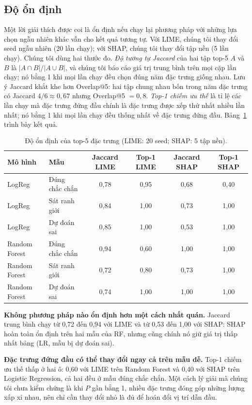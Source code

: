 \documentclass[11pt,a4paper]{article}
\begin{document}
\subsection{Độ ổn định}
\label{sec:stability}
Một lời giải thích được coi là ổn định nếu chạy lại phương pháp với những lựa
chọn ngẫu nhiên khác vẫn cho kết quả tương tự. Với LIME, chúng tôi thay đổi
seed ngẫu nhiên (20 lần chạy); với SHAP, chúng tôi thay đổi tập nền (5 lần
chạy). Chúng tôi dùng hai thước đo. \emph{Độ tương tự Jaccard} của hai tập
top-5 $A$ và $B$ là $|A \cap B| / |A \cup B|$, và chúng tôi báo cáo giá trị
trung bình trên mọi cặp lần chạy; nó bằng 1 khi mọi lần chạy đều chọn đúng
năm đặc trưng giống nhau. Lưu ý Jaccard khắt khe hơn Overlap@5: hai tập chung
nhau bốn trong năm đặc trưng có Jaccard $4/6 \approx 0{,}67$ nhưng Overlap@5
$= 0{,}8$. \emph{Top-1 chiếm ưu thế} là tỉ lệ các lần chạy mà đặc trưng đứng
đầu chính là đặc trưng được xếp thứ nhất nhiều lần nhất; nó bằng 1 khi mọi
lần chạy đều thống nhất về đặc trưng đứng đầu.
Bảng~\ref{tab:stability} trình bày kết quả.

\begin{table}[!htb]
\centering\small
\caption{Độ ổn định của top-5 đặc trưng (LIME: 20 seed; SHAP: 5 tập nền).}\label{tab:stability}
\setlength{\tabcolsep}{4pt}
\begin{tabular}{llcccc}
\toprule
\textbf{Mô hình} & \textbf{Mẫu} & \textbf{Jaccard LIME} & \textbf{Top-1 LIME} & \textbf{Jaccard SHAP} & \textbf{Top-1 SHAP}\\
\midrule
LogReg & Đúng chắc chắn & 0,78 & 0,95 & 0,68 & 0,40\\
LogReg & Sát ranh giới & 0,84 & 1,00 & 0,73 & 1,00\\
LogReg & Dự đoán sai & 0,85 & 1,00 & 0,53 & 1,00\\
Random Forest & Đúng chắc chắn & 0,94 & 0,60 & 1,00 & 1,00\\
Random Forest & Sát ranh giới & 0,72 & 0,80 & 0,73 & 1,00\\
Random Forest & Dự đoán sai & 0,74 & 1,00 & 1,00 & 1,00\\
\bottomrule
\end{tabular}
\end{table}

\textbf{Không phương pháp nào ổn định hơn một cách nhất quán.} Jaccard trung
bình chạy từ 0,72 đến 0,94 với LIME và từ 0,53 đến 1,00 với SHAP: SHAP hoàn
toàn ổn định trên hai mẫu của RF, nhưng cũng chính nó giữ giá trị thấp nhất
bảng (LR, mẫu bị dự đoán sai).

\textbf{Đặc trưng đứng đầu có thể thay đổi ngay cả trên mẫu dễ.} Top-1 chiếm
ưu thế thấp ở hai ô: 0,60 với LIME trên Random Forest và 0,40 với SHAP trên
Logistic Regression, cả hai đều ở mẫu đúng chắc chắn. Một cách lý giải mà
chúng tôi chưa kiểm chứng là khi $P$ gần bằng 1, nhiều đặc trưng đóng góp
những lượng xấp xỉ nhau, nên chỉ cần thay đổi nhỏ là đủ để hoán đổi vị trí
dẫn đầu.
\end{document}
